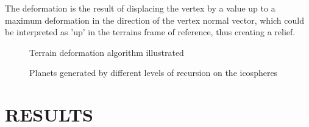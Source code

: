 \documentclass[a4paper,twoside]{article}
\begin{document}
The deformation is the result of displacing the vertex by a value up to a maximum deformation in the direction of the vertex normal vector, which could be interpreted as 'up' in the terrains frame of reference, thus creating a relief.

\begin{figure}
\caption{Terrain deformation algorithm illustrated}
\label{fig_tda}
\end{figure}

\begin{figure}
\caption{Planets generated by different levels of recursion on the icospheres}
\label{fig_iterations}
\end{figure}

\section{\uppercase{Results}}
\label{sec:results}

\vfill
\end{document}
